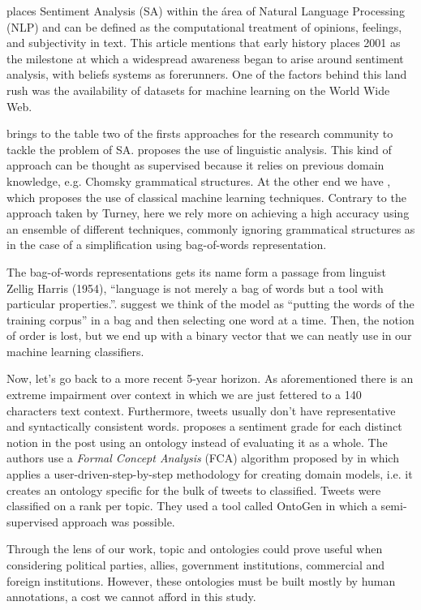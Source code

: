\documentclass[author-year, review]{elsarticle} %
\let\parencite\cite
\begin{document}
\parencite{1--22008}
places Sentiment Analysis (SA) within the área of Natural Language
Processing (NLP) and can be defined as the computational treatment of
opinions, feelings, and subjectivity in text. This article mentions that
early history places 2001 as the milestone at which a widespread
awareness began to arise around sentiment analysis, with beliefs systems
as forerunners. One of the factors behind this land rush was the
availability of datasets for machine learning on the World Wide Web.

\parencite{12014}
brings to the table two of the firsts approaches for the research
community to tackle the problem of SA.
\parencite{2002b}
proposes the use of linguistic analysis. This kind of approach can be
thought as supervised because it relies on previous domain knowledge,
e.g. Chomsky grammatical structures. At the other end we have
\parencite{2002a},
which proposes the use of classical machine learning techniques.
Contrary to the approach taken by Turney, here we rely more on achieving
a high accuracy using an ensemble of different techniques, commonly
ignoring grammatical structures as in the case of a simplification using
bag-of-words representation.

The bag-of-words representations gets its name form a passage from
linguist Zellig Harris (1954), ``language is not merely a bag of words
but a tool with particular properties.''.
\parencite{2012}
suggest we think of the model as ``putting the words of the training
corpus'' in a bag and then selecting one word at a time. Then, the
notion of order is lost, but we end up with a binary vector that we can
neatly use in our machine learning classifiers.

Now, let's go back to a more recent 5-year horizon. As aforementioned
there is an extreme impairment over context in which we are just
fettered to a 140 characters text context. Furthermore, tweets usually
don't have representative and syntactically consistent words.
\parencite{102013}
proposes a sentiment grade for each distinct notion in the post using an
ontology instead of evaluating it as a whole. The authors use a
\emph{Formal Concept Analysis} (FCA) algorithm proposed by
\parencite{1999}
in which applies a user-driven-step-by-step methodology for creating
domain models, i.e. it creates an ontology specific for the bulk of
tweets to classified. Tweets were classified on a rank per topic. They
used a tool called OntoGen in which a semi-supervised approach was
possible.

Through the lens of our work, topic and ontologies could prove useful
when considering political parties, allies, government institutions,
commercial and foreign institutions. However, these ontologies must be
built mostly by human annotations, a cost we cannot afford in this
study.
\end{document}
